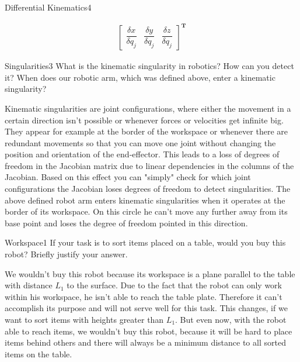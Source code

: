 \begin{questions}
\begin{question}{Differential Kinematics}{4}
\begin{answer}
\begin{align*}
	\begin{bmatrix}
	\dfrac{\delta x }{ \delta q_j} & \dfrac{\delta y}{ \delta q_j} & \dfrac{\delta z}{\delta q_j}
	\end{bmatrix}^\textbf{T}
\end{align*}



\end{answer}

\end{question}


\begin{question}{Singularities}{3}
What is the kinematic singularity in robotics? How can you detect it? When does our robotic arm, which was defined above, enter a kinematic singularity?

\begin{answer}
	Kinematic singularities are joint configurations, where either the movement in a certain direction isn't possible or whenever forces or velocities get infinite big. They appear for example at the border of the workspace or whenever there are redundant movements so that you can move one joint without changing the position and orientation of the end-effector. This leads to a loss of degrees of freedom in the Jacobian matrix due to linear dependencies in the columns of the Jacobian. Based on this effect you can "simply" check for which joint configurations the Jacobian loses degrees of freedom to detect singularities.
	The above defined robot arm enters kinematic singularities when it operates at the border of its workspace. On this circle he can't move any further away from its base point and loses the degree of freedom pointed in this direction.
\end{answer}

\end{question}


\begin{question}{Workspace}{1}
If your task is to sort items placed on a table, would you buy this robot? Briefly justify your answer.

\begin{answer}
We wouldn't buy this robot because its workspace is a plane parallel to the table with distance $L_1$ to the surface. Due to the fact that the robot can only work within his workspace, he isn't able to reach the table plate. Therefore it can't accomplish its purpose and will not serve well for this task. This changes, if we want to sort items with heights greater than $L_1$. But even now, with the robot able to reach items, we wouldn't buy this robot, because it will be hard to place items behind others and there will always be a minimum distance to all sorted items on the table.
\end{answer}

\end{question}

\end{questions}
